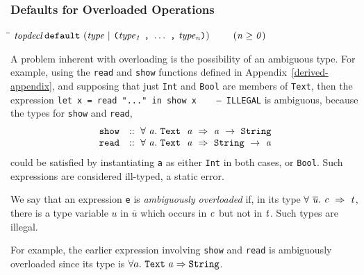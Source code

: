 \subsubsection{Defaults for Overloaded Operations}
\label{default-decls}

\begin{flushleft}\it\begin{tabbing}
\hspace{0.5in}\=\hspace{3.0in}\=\kill
$\it topdecl$\>\makebox[3.5em]{$\rightarrow$}$\it \makebox{\tt default}\ (type\ |\ \makebox{\tt (}type_1\ \makebox{\tt ,}\ \ldots \ \makebox{\tt ,}\ type_n\makebox{\tt )})$\>\makebox[3em]{}$\it \qquad\ (n\geq 0)$
\end{tabbing}\end{flushleft}

\noindent
A problem inherent with overloading is the possibility of an ambiguous type.
For example, using the
\mbox{\tt read} and \mbox{\tt show} functions defined in Appendix~\ref{derived-appendix},
and supposing that just \mbox{\tt Int} and \mbox{\tt Bool} are members of \mbox{\tt Text}, then
the expression
\bprog
\mbox{\tt let\ x\ =\ read\ "..."\ in\ show\ x\ \ \ \ --\ ILLEGAL}
\eprog
is ambiguous, because the types for \mbox{\tt show} and \mbox{\tt read},
\[\begin{array}{ll}
\mbox{\tt show} & \mbox{$\it ::\ \forall\ a.~\makebox{\tt Text}~\ a\ \Rightarrow\ a\ \rightarrow\ \makebox{\tt String}$} \\
\mbox{\tt read} & \mbox{$\it ::\ \forall\ a.~\makebox{\tt Text}~\ a\ \Rightarrow\ \makebox{\tt String}\ \rightarrow\ a$}
\end{array}\]
could be satisfied by instantiating \mbox{\tt a} as either \mbox{\tt Int}
in both cases, or \mbox{\tt Bool}.  Such expressions
are considered ill-typed, a static error.

We say that an expression \mbox{\tt e} is {\em ambiguously
overloaded}
if, in its type \mbox{$\it \forall\ \overline{u}.~c\ \Rightarrow\ t$}, 
there is a type variable $u$ in $\overline{u}$ which occurs in \mbox{$\it c$} 
but not in \mbox{$\it t$}.  Such types are illegal.

For example, the earlier expression involving \mbox{\tt show} and \mbox{\tt read} is
ambiguously overloaded since its type is 
$\forall a.~ \mbox{\tt Text}~ a \Rightarrow \mbox{\tt String}$.

